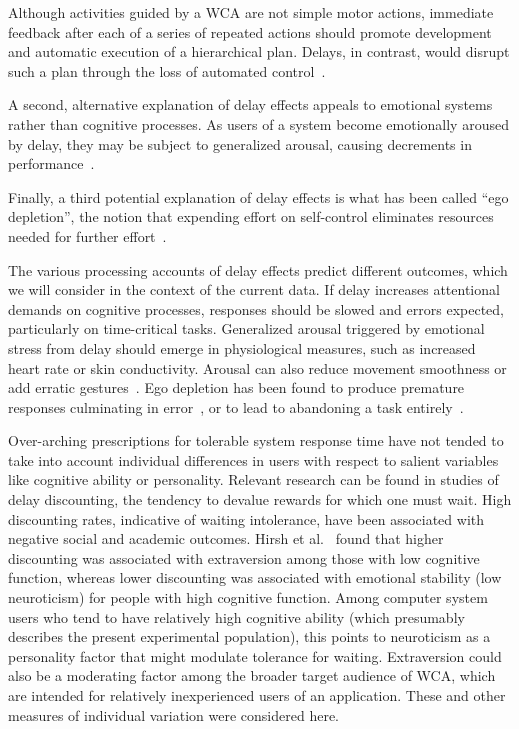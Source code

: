 Although activities guided by a \gls{WCA} are not simple motor actions, immediate feedback after each of a series of repeated actions should promote development and automatic execution of a hierarchical plan.
Delays, in contrast, would disrupt such a plan through the loss of automated control~\cite{lee2019limiting}.

A second, alternative explanation of delay effects appeals to emotional systems rather than cognitive processes.
As users of a system become emotionally aroused by delay, they may be subject to generalized arousal, causing decrements in performance~\cite{lee2019limiting}.

Finally, a third potential explanation of delay effects is what has been called ``ego depletion'', the notion that expending effort on self-control eliminates resources needed for further effort~\cite{baumeister74tice,lin2020strong}.

The various processing accounts of delay effects predict different outcomes, which we will consider in the context of the current data.
If delay increases attentional demands on cognitive processes, responses should be slowed and errors expected, particularly on time-critical tasks.
Generalized arousal triggered by emotional stress from delay should emerge in physiological measures, such as increased heart rate or skin conductivity.
Arousal can also reduce movement smoothness or add erratic gestures~\cite{pijpers2003anxiety}.
Ego depletion has been found to produce premature responses culminating in error~\cite{lin2020strong}, or to lead to abandoning a task entirely~\cite{baumeister74tice}.

Over-arching prescriptions for tolerable system response time have not tended to take into account individual differences in users with respect to salient variables like cognitive ability or personality.
Relevant research can be found in studies of delay discounting, the tendency to devalue rewards for which one must wait.
High discounting rates, indicative of waiting intolerance, have been associated with negative social and academic outcomes.
Hirsh et al.~\cite{hirsh2008delay} found that higher discounting was associated with extraversion among those with low cognitive function, whereas lower discounting was associated with emotional stability (low neuroticism) for people with high cognitive function.
Among computer system users who tend to have relatively high cognitive ability (which presumably describes the present experimental population), this points to neuroticism as a personality factor that might modulate tolerance for waiting. Extraversion could also  be  a moderating factor among the broader target audience of \gls{WCA}, which are intended for relatively inexperienced users of an application.
These and other measures of individual variation were considered here.

